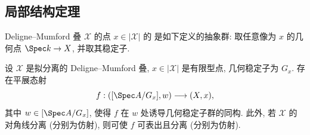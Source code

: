 \subsection{局部结构定理}\label{src:5.3.1-subsection}
Deligne--Mumford 叠 $\mathcal X$ 的点 $x\in|\mathcal X|$ 的 是如下定义的抽象群: 取任意像为 $x$ 的几何点 $\Spec k\to\mathcal X$, 并取其稳定子.
\begin{theorem}\label{src:5.3.1}
设 $\mathcal X$ 是拟分离的 Deligne--Mumford 叠, $x\in|\mathcal X|$ 是有限型点, 几何稳定子为 $G_x$. 存在平展态射
\[
f:([\Spec A/G_x],w)\longrightarrow(\mathcal X,x),
\]
其中 $w\in[\Spec A/G_x]$, 使得 $f$ 在 $w$ 处诱导几何稳定子群的同构. 此外, 若 $\mathcal X$ 的对角线分离 (分别为仿射), 则可使 $f$ 可表出且分离 (分别为仿射).
\end{theorem}
